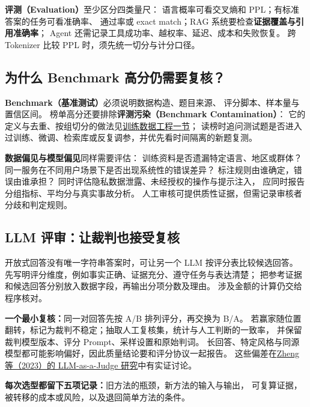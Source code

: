\textbf{评测（Evaluation）}至少区分四类量尺：
语言概率可看交叉熵和 PPL；有标准答案的任务可看准确率、
通过率或 exact match；RAG 系统要检查\textbf{证据覆盖与引用准确率}；
Agent 还需记录工具成功率、越权率、延迟、成本和失败恢复。
跨 Tokenizer 比较 PPL 时，须先统一切分与计分口径。

\subsection{为什么 Benchmark 高分仍需要复核？}
\label{concept:evaluation-contamination-benchmark}

\textbf{Benchmark（基准测试）}必须说明数据构造、题目来源、
评分脚本、样本量与置信区间。
榜单高分还要排除\textbf{评测污染（Benchmark Contamination）}：
它的定义与去重、按组切分的做法见\hyperref[concept:evaluation-contamination]{训练数据工程一节}；
读榜时追问测试题是否进入过训练、微调、检索库或反复调参，并优先看时间隔离的新题复测。

\textbf{数据偏见与模型偏见}同样需要评估：
训练资料是否遗漏特定语言、地区或群体？
同一服务在不同用户场景下是否出现系统性的错误差异？
标注规则由谁确定，错误由谁承担？
同时评估隐私数据泄露、未经授权的操作与提示注入，
应同时报告分组指标、平均分与真实事故分析。
人工审核可提供质性证据，但需记录审核者分歧和判定规则。

\subsection{LLM 评审：让裁判也接受复核}
\label{concept:llm-judge}

开放式回答没有唯一字符串答案时，可让另一个 LLM 按评分表比较候选回答。
先写明评分维度，例如事实正确、证据充分、遵守任务与表达清楚；
把参考证据和候选回答分别放入数据字段，再输出分项分数及理由。
涉及金额的计算仍交给程序核对。

\textbf{一个最小复核：}同一对回答先按 A/B 排列评分，再交换为 B/A。
若赢家随位置翻转，标记为裁判不稳定；抽取人工复核集，统计与人工判断的一致率，
并保留裁判模型版本、评分 Prompt、采样设置和原始判词。
长回答、特定风格与同源模型都可能影响偏好，因此质量结论要和评分协议一起报告。
这些偏差在\href{https://arxiv.org/abs/2306.05685}{Zheng 等（2023）的 LLM-as-a-Judge 研究}中有实证讨论。

\textbf{每次选型都留下五项记录：}旧方法的瓶颈，新方法的输入与输出，
可复算证据，被转移的成本或风险，以及退回简单方法的条件。

